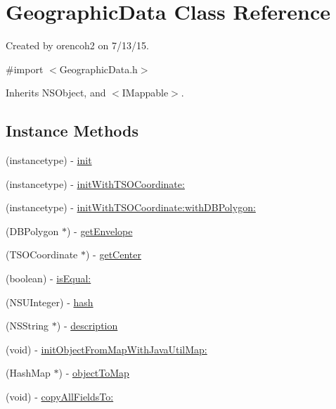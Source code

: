 \hypertarget{interface_geographic_data}{}\section{Geographic\+Data Class Reference}
\label{interface_geographic_data}


Created by orencoh2 on 7/13/15.  




{\ttfamily \#import $<$Geographic\+Data.\+h$>$}



Inherits N\+S\+Object, and $<$\+I\+Mappable$>$.

\subsection*{Instance Methods}
\begin{DoxyCompactItemize}
\item 
(instancetype) -\/ \hyperlink{interface_geographic_data_abea4874264cd24fa5ecfd61ff5d48351}{init}
\item 
(instancetype) -\/ \hyperlink{interface_geographic_data_afd7dfc7d8208da635c74c76c3bc2747f}{init\+With\+T\+S\+O\+Coordinate\+:}
\item 
(instancetype) -\/ \hyperlink{interface_geographic_data_abe991ef20d78a4cc539304aa63eb289b}{init\+With\+T\+S\+O\+Coordinate\+:with\+D\+B\+Polygon\+:}
\item 
(D\+B\+Polygon $\ast$) -\/ \hyperlink{interface_geographic_data_a84c1514885680971bb61a5a27463077e}{get\+Envelope}
\item 
(T\+S\+O\+Coordinate $\ast$) -\/ \hyperlink{interface_geographic_data_a00b3ee1067e402a0b6c25d80d62b3f84}{get\+Center}
\item 
(boolean) -\/ \hyperlink{interface_geographic_data_aeccc2d4b519c0b9295c425ba5242130c}{is\+Equal\+:}
\item 
(N\+S\+U\+Integer) -\/ \hyperlink{interface_geographic_data_ab438b07a390b92379fd29648590602f5}{hash}
\item 
(N\+S\+String $\ast$) -\/ \hyperlink{interface_geographic_data_a66b64d20ddd2ac4be358b5500347f88b}{description}
\item 
(void) -\/ \hyperlink{interface_geographic_data_a58decf23f40b071d4a6970525478ca68}{init\+Object\+From\+Map\+With\+Java\+Util\+Map\+:}
\item 
(Hash\+Map $\ast$) -\/ \hyperlink{interface_geographic_data_a9124c8065edbf1aecf5e926bd6dc871a}{object\+To\+Map}
\item 
(void) -\/ \hyperlink{interface_geographic_data_a1d580cde2d3702b5322f3db7030a085f}{copy\+All\+Fields\+To\+:}
\end{DoxyCompactItemize}
